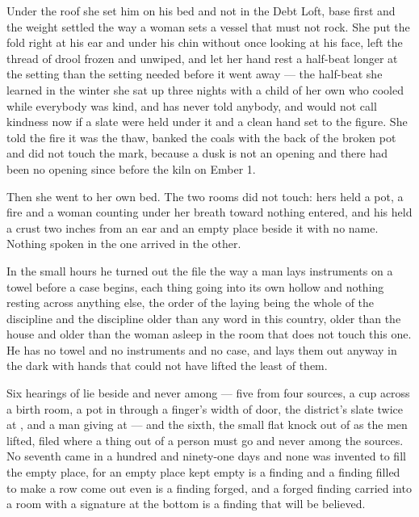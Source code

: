 Under the roof she set him on his bed and not in the Debt Loft, base first and the weight settled the way a woman sets a vessel that must not rock. She put the fold right at his ear and under his chin without once looking at his face, left the thread of drool frozen and unwiped, and let her hand rest a half-beat longer at the setting than the setting needed before it went away --- the half-beat she learned in the winter she sat up three nights with a child of her own who cooled while everybody was kind, and has never told anybody, and would not call kindness now if a slate were held under it and a clean hand set to the figure. She told the fire it was the thaw, banked the coals with the back of the broken pot and did not touch the mark, because a dusk is not an opening and there had been no opening since before the kiln on Ember 1.

Then she went to her own bed. The two rooms did not touch: hers held a pot, a fire and a woman counting under her breath toward nothing entered, and his held a crust two inches from an ear and an empty place beside it with no name. Nothing spoken in the one arrived in the other.

\scenebreak

In the small hours he turned out the file the way a man lays instruments on a towel before a case begins, each thing going into its own hollow and nothing resting across anything else, the order of the laying being the whole of the discipline and the discipline older than any word in this country, older than the house and older than the woman asleep in the room that does not touch this one. He has no towel and no instruments and no case, and lays them out anyway in the dark with hands that could not have lifted the least of them.

Six hearings of  lie beside and never among --- five from four sources, a cup across a birth room, a pot in  through a finger's width of door, the district's slate twice at , and a man giving at  --- and the sixth, the small flat knock out of  as the men lifted, filed where a thing out of a person must go and never among the sources. No seventh came in a hundred and ninety-one days and none was invented to fill the empty place, for an empty place kept empty is a finding and a finding filled to make a row come out even is a finding forged, and a forged finding carried into a room with a signature at the bottom is a finding that will be believed.

